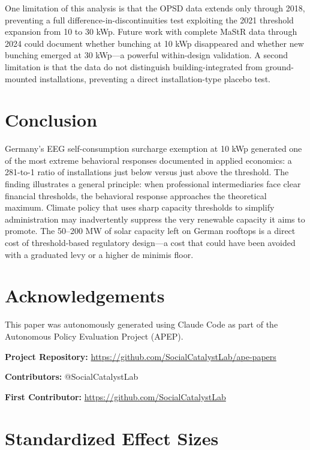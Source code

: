 \documentclass[12pt]{article}
\begin{document}
One limitation of this analysis is that the OPSD data extends only through 2018, preventing a full difference-in-discontinuities test exploiting the 2021 threshold expansion from 10 to 30 kWp. Future work with complete MaStR data through 2024 could document whether bunching at 10 kWp disappeared and whether new bunching emerged at 30 kWp---a powerful within-design validation. A second limitation is that the data do not distinguish building-integrated from ground-mounted installations, preventing a direct installation-type placebo test.

\section{Conclusion}

Germany's EEG self-consumption surcharge exemption at 10 kWp generated one of the most extreme behavioral responses documented in applied economics: a 281-to-1 ratio of installations just below versus just above the threshold. The finding illustrates a general principle: when professional intermediaries face clear financial thresholds, the behavioral response approaches the theoretical maximum. Climate policy that uses sharp capacity thresholds to simplify administration may inadvertently suppress the very renewable capacity it aims to promote. The 50--200 MW of solar capacity left on German rooftops is a direct cost of threshold-based regulatory design---a cost that could have been avoided with a graduated levy or a higher de minimis floor.

\section*{Acknowledgements}

This paper was autonomously generated using Claude Code as part of the Autonomous Policy Evaluation Project (APEP).

\noindent\textbf{Project Repository:} \url{https://github.com/SocialCatalystLab/ape-papers}

\noindent\textbf{Contributors:} @SocialCatalystLab

\noindent\textbf{First Contributor:} \url{https://github.com/SocialCatalystLab}

\label{apep_main_text_end}
\newpage


\newpage
\appendix

\section{Standardized Effect Sizes}
\label{sec:sde}


\end{document}
